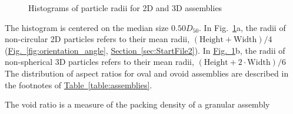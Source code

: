 \documentclass[letterpaper,11pt]{article}
\begin{document}
\begin{figure}
\centering
{}%
%
\caption{Histograms of particle radii for 2D and 3D assemblies}
\label{fig:radii}
\end{figure}
The histogram is centered on the median size $0.50D_{50}$.
In Fig.~\ref{fig:radii}a, the radii of non-circular 2D particles 
refers to their mean radii, $(\mathrm{Height} + \mathrm{Width})/4$
(\hyperref[fig:orientation_angle]{Fig.~\ref*{fig:orientation_angle}},
\hyperref[sec:StartFile2]{Section~\ref*{sec:StartFile2}}).
In \hyperref[fig:radii]{Fig.~\ref*{fig:radii}}b,
the radii of non-spherical 3D particles
refers to their mean radii, $(\mathrm{Height} + 2\cdot\mathrm{Width})/6$
The distribution of aspect ratios for oval and ovoid assemblies
are described in the footnotes of
\hyperref[table:assemblies]{Table~\ref*{table:assemblies}}.
\par
The void ratio is a measure of the packing density of 
a granular assembly 
\end{document}
